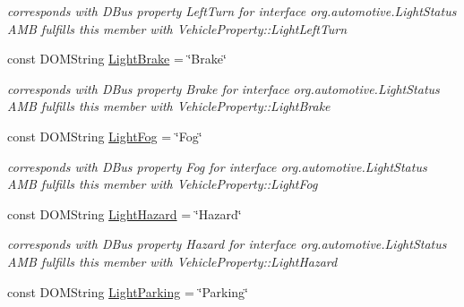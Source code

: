 \begin{DoxyCompactItemize}
\begin{DoxyCompactList}\small\item\em corresponds with D\+Bus property Left\+Turn for interface org.\+automotive.\+Light\+Status A\+M\+B fulfills this member with Vehicle\+Property\+::\+Light\+Left\+Turn \end{DoxyCompactList}\item 
\hypertarget{interfaceLightStatus_a8327693a866627c74d0fd1756dbef63b}{const D\+O\+M\+String \hyperlink{interfaceLightStatus_a8327693a866627c74d0fd1756dbef63b}{Light\+Brake} = \char`\"{}Brake\char`\"{}}\label{interfaceLightStatus_a8327693a866627c74d0fd1756dbef63b}

\begin{DoxyCompactList}\small\item\em corresponds with D\+Bus property Brake for interface org.\+automotive.\+Light\+Status A\+M\+B fulfills this member with Vehicle\+Property\+::\+Light\+Brake \end{DoxyCompactList}\item 
\hypertarget{interfaceLightStatus_acb751728107b12b31faac160908322d1}{const D\+O\+M\+String \hyperlink{interfaceLightStatus_acb751728107b12b31faac160908322d1}{Light\+Fog} = \char`\"{}Fog\char`\"{}}\label{interfaceLightStatus_acb751728107b12b31faac160908322d1}

\begin{DoxyCompactList}\small\item\em corresponds with D\+Bus property Fog for interface org.\+automotive.\+Light\+Status A\+M\+B fulfills this member with Vehicle\+Property\+::\+Light\+Fog \end{DoxyCompactList}\item 
\hypertarget{interfaceLightStatus_ac3fa4b04ad2c5d9fbed6cb2603004878}{const D\+O\+M\+String \hyperlink{interfaceLightStatus_ac3fa4b04ad2c5d9fbed6cb2603004878}{Light\+Hazard} = \char`\"{}Hazard\char`\"{}}\label{interfaceLightStatus_ac3fa4b04ad2c5d9fbed6cb2603004878}

\begin{DoxyCompactList}\small\item\em corresponds with D\+Bus property Hazard for interface org.\+automotive.\+Light\+Status A\+M\+B fulfills this member with Vehicle\+Property\+::\+Light\+Hazard \end{DoxyCompactList}\item 
\hypertarget{interfaceLightStatus_a2a2cdf6c21d27b16240a8b6be1dca8a4}{const D\+O\+M\+String \hyperlink{interfaceLightStatus_a2a2cdf6c21d27b16240a8b6be1dca8a4}{Light\+Parking} = \char`\"{}Parking\char`\"{}}\label{interfaceLightStatus_a2a2cdf6c21d27b16240a8b6be1dca8a4}


\end{DoxyCompactItemize}
